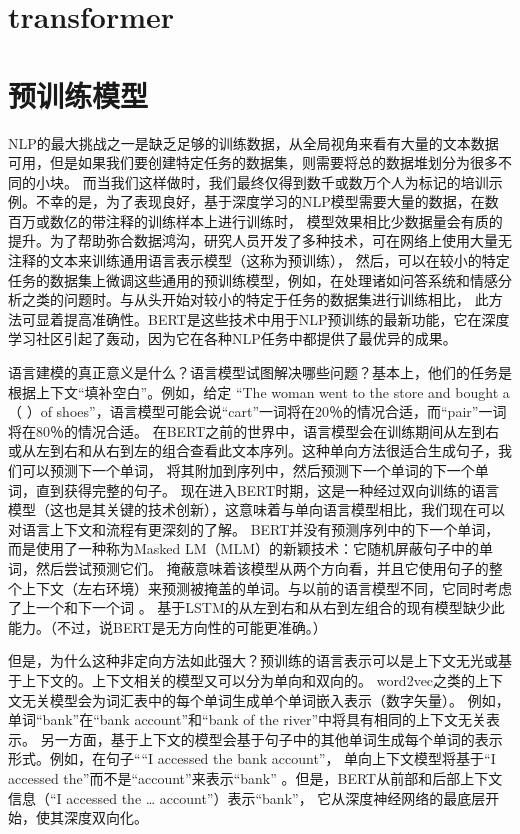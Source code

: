\section{transformer}
\section{预训练模型}
NLP的最大挑战之一是缺乏足够的训练数据，从全局视角来看有大量的文本数据可用，但是如果我们要创建特定任务的数据集，则需要将总的数据堆划分为很多不同的小块。
而当我们这样做时，我们最终仅得到数千或数万个人为标记的培训示例。不幸的是，为了表现良好，基于深度学习的NLP模型需要大量的数据，在数百万或数亿的带注释的训练样本上进行训练时，
模型效果相比少数据量会有质的提升。为了帮助弥合数据鸿沟，研究人员开发了多种技术，可在网络上使用大量无注释的文本来训练通用语言表示模型（这称为预训练），
然后，可以在较小的特定任务的数据集上微调这些通用的预训练模型，例如，在处理诸如问答系统和情感分析之类的问题时。与从头开始对较小的特定于任务的数据集进行训练相比，
此方法可显着提高准确性。BERT是这些技术中用于NLP预训练的最新功能，它在深度学习社区引起了轰动，因为它在各种NLP任务中都提供了最优异的成果。

语言建模的真正意义是什么？语言模型试图解决哪些问题？基本上，他们的任务是根据上下文“填补空白”。例如，给定
“The woman went to the store and bought a（ ）of shoes”，语言模型可能会说“cart”一词将在20％的情况合适，而“pair”一词将在80％的情况合适。
在BERT之前的世界中，语言模型会在训练期间从左到右或从左到右和从右到左的组合查看此文本序列。这种单向方法很适合生成句子，我们可以预测下一个单词，
将其附加到序列中，然后预测下一个单词的下一个单词，直到获得完整的句子。
现在进入BERT时期，这是一种经过双向训练的语言模型（这也是其关键的技术创新），这意味着与单向语言模型相比，我们现在可以对语言上下文和流程有更深刻的了解。
BERT并没有预测序列中的下一个单词，而是使用了一种称为Masked LM（MLM）的新颖技术：它随机屏蔽句子中的单词，然后尝试预测它们。
掩蔽意味着该模型从两个方向看，并且它使用句子的整个上下文（左右环境）来预测被掩盖的单词。与以前的语言模型不同，它同时考虑了上一个和下一个词 。
基于LSTM的从左到右和从右到左组合的现有模型缺少此能力。（不过，说BERT是无方向性的可能更准确。）

但是，为什么这种非定向方法如此强大？预训练的语言表示可以是上下文无光或基于上下文的。上下文相关的模型又可以分为单向和双向的。
word2vec之类的上下文无关模型会为词汇表中的每个单词生成单个单词嵌入表示（数字矢量）。
例如，单词“bank”在“bank account”和“bank of the river”中将具有相同的上下文无关表示。
另一方面，基于上下文的模型会基于句子中的其他单词生成每个单词的表示形式。例如，在句子““I accessed the bank account”，
单向上下文模型将基于“I accessed the”而不是“account”来表示“bank” 。但是，BERT从前部和后部上下文信息（“I accessed the … account”）表示“bank”，
它从深度神经网络的最底层开始，使其深度双向化。

